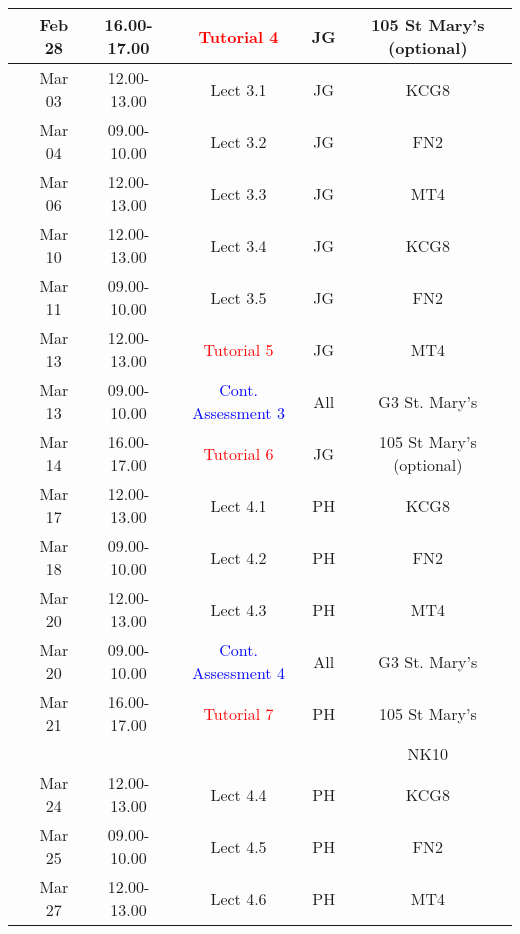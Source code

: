 \documentclass[11pt,oneside,a4paper]{article}
\begin{document}
\begin{center}
\begin{tabular}{||c||c|c|c|c|c||}
                                      & Feb 28   & 16.00-17.00 & \textcolor{red}{Tutorial 4} & JG  & 105 St Mary's (optional)\\
\hline
\multirow{3}{*}{\color{red}{Week 34}} & Mar 03   & 12.00-13.00 & Lect  3.1  & JG  & KCG8 \\
                                      & Mar 04   & 09.00-10.00 & Lect  3.2  & JG  & FN2  \\
                                      & Mar 06   & 12.00-13.00 & Lect  3.3  & JG  & MT4  \\
\hline
\multirow{3}{*}{\color{red}{Week 35}} & Mar 10   & 12.00-13.00 & Lect  3.4  & JG  & KCG8 \\
                                      & Mar 11   & 09.00-10.00 & Lect  3.5  & JG  & FN2  \\
                                      & Mar 13   & 12.00-13.00 & \textcolor{red}{Tutorial 5} & JG  & MT4  \\
                                      & Mar 13   & 09.00-10.00 & \textcolor{blue}{Cont. Assessment 3}& All  &  G3 St. Mary's \\
                                      & Mar 14   & 16.00-17.00 & \textcolor{red}{Tutorial 6} & JG  & 105 St Mary's (optional)\\
\hline
\multirow{3}{*}{\color{red}{Week 36}} & Mar 17   & 12.00-13.00 & Lect  4.1  & PH  & KCG8 \\
                                      & Mar 18   & 09.00-10.00 & Lect  4.2  & PH  & FN2  \\
                                      & Mar 20   & 12.00-13.00 & Lect  4.3  & PH  & MT4  \\
                                      & Mar 20   & 09.00-10.00 & \textcolor{blue}{Cont. Assessment 4}& All  &  G3 St. Mary's \\
                                      & Mar 21   & 16.00-17.00 & \textcolor{red}{Tutorial 7} & PH  & 105 St Mary's\\
                                      &          &             &             &     & NK10 \\
\hline
\multirow{3}{*}{\color{red}{Week 37}} & Mar 24   & 12.00-13.00 & Lect  4.4  & PH  & KCG8 \\
                                      & Mar 25   & 09.00-10.00 & Lect  4.5  & PH  & FN2  \\
                                      & Mar 27   & 12.00-13.00 & Lect  4.6  & PH  & MT4  \\
\hline\hline

\end{tabular}
\end{center}
\end{document}

